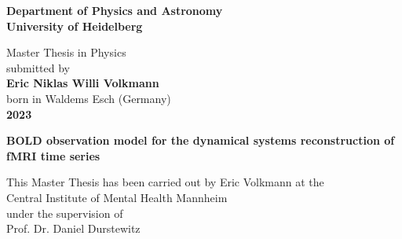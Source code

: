 \begin{titlepage}
\begin{center}
 
\Large\textbf{Department of Physics and Astronomy\\
University of Heidelberg}

\vspace{13cm}

\normalsize
Master Thesis in Physics\\
submitted by\\
\vspace{0.5cm}
\Large\textbf{Eric Niklas Willi Volkmann}\\
\normalsize
\vspace{0.5cm}
born in Waldems Esch (Germany)\\
\vspace{0.5cm}
\Large\textbf{2023}
\normalsize

\newpage
	\thispagestyle{empty}
\phantom{blabla}
\newpage



\Large\textbf{BOLD observation model for the dynamical systems reconstruction of fMRI time series}

\vspace{15cm}

\normalsize
This Master Thesis has been carried out by Eric Volkmann at the\\
Central Institute of Mental Health Mannheim\\
under the supervision of\\
Prof. Dr. Daniel Durstewitz
\thispagestyle{empty}
\vfill
\end{center}

\end{titlepage}
